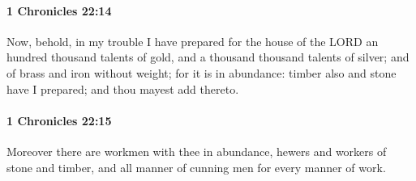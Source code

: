 		\paragraph{1 Chronicles 22:14} %
			\label{1CHRONICLES-22-14}

			Now, behold, in my trouble I have prepared for the house of the LORD an hundred thousand talents of gold, and a thousand thousand talents of silver; and of brass and iron without weight; for it is in abundance: timber also and stone have I prepared; and thou mayest add thereto.


		\paragraph{1 Chronicles 22:15} %
			\label{1CHRONICLES-22-15}

			Moreover there are workmen with thee in abundance, hewers and workers of stone and timber, and all manner of cunning men for every manner of work.

